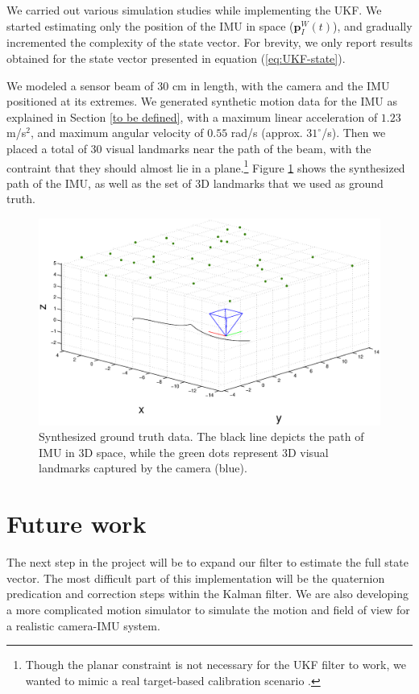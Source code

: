 \documentclass[letterpaper]{article}
\newcommand{\bb}[1]{\mathbf{#1}}
\begin{document}

We carried out various simulation studies while implementing the
UKF. We started estimating only the position of the IMU in space
($\bb{p}_I^W(t)$), and gradually incremented the complexity of the
state vector. For brevity, we only report results obtained for the
state vector presented in equation (\ref{eq:UKF-state}).

We modeled a sensor beam of $30$ cm in length, with the camera and the
IMU positioned at its extremes. We generated synthetic motion data for
the IMU as explained in Section \ref{to be defined}, with a maximum
linear acceleration of $1.23$ m/s$^2$, and maximum angular velocity of
$0.55$ rad/s (approx. $31^\circ$/s).  Then we placed a total of 30
visual landmarks near the path of the beam, with the contraint that
they should almost lie in a plane.\footnote{Though the planar
  constraint is not necessary for the UKF filter to work, we wanted to
  mimic a real target-based calibration scenario
  \cite{2011:kelly:article}.}  Figure \ref{fig:groundtruth} shows the
synthesized path of the IMU, as well as the set of 3D landmarks that
we used as ground truth.

\begin{figure}[h!p]
\centering
\includegraphics[width=.7\linewidth]{groundTruth.eps}
\caption{Synthesized ground truth data. The black line depicts the
  path of IMU in 3D space, while the green dots represent 3D visual
  landmarks captured by the camera (blue).}
\label{fig:groundtruth}
\end{figure}


\section{Future work}
The next step in the project will be to expand our filter to estimate the full state vector. The most difficult part of this implementation will be the quaternion predication and correction steps within the Kalman filter. We are also developing a more complicated motion simulator to simulate the motion and field of view for a realistic camera-IMU system.




\end{document}
